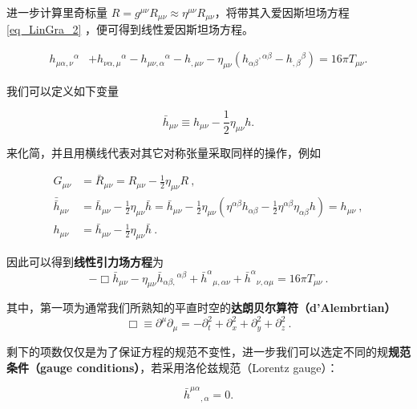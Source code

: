 进一步计算里奇标量 $R = g^{\mu\nu}R_{\mu\nu}\approx \eta^{\mu\nu}R_{\mu\nu}$，将带其入爱因斯坦场方程\autoref{eq_LinGra_2}  ，便可得到线性爱因斯坦场方程。

\begin{equation}
\begin{aligned}
h_{\mu \alpha, \nu}{ }^{\alpha} &+h_{\nu \alpha, \mu}{ }^{\alpha}-h_{\mu \nu, \alpha}{ }^{\alpha}-h_{, \mu \nu} -\eta_{\mu \nu}\left(h_{\alpha \beta}{ }^{, \alpha \beta}-h_{, \beta}{ }^{\beta}\right)= 16 \pi T_{\mu \nu} .
\end{aligned}
\end{equation}

我们可以定义如下变量

\begin{equation}
\bar{h}_{\mu\nu} \equiv h_{\mu\nu} - \frac{1}{2}\eta_{\mu\nu}h.
\end{equation}

来化简，并且用横线代表对其它对称张量采取同样的操作，例如

\begin{align}
G_{\mu\nu} &= \bar{R}_{\mu\nu} = R_{\mu\nu}- \frac{1}{2}\eta_{\mu\nu}R~,\\
\bar{\bar{h}}_{\mu\nu} &= \bar{h}_{\mu\nu} - \frac{1}{2}\eta_{\mu\nu}\bar{h} = \bar{h}_{\mu\nu} - \frac{1}{2}\eta_{\mu\nu} (\eta^{\alpha\beta}h_{\alpha\beta}-\frac{1}{2}\eta^{\alpha\beta}\eta_{\alpha\beta}h)= h_{\mu\nu}~,\\
h_{\mu\nu} &= \bar{h}_{\mu\nu} - \frac{1}{2}\eta_{\mu\nu} \bar{h}~.
\end{align}

因此可以得到\textbf{线性引力场方程}为
\begin{equation}
-\Box{\bar{h}_{\mu \nu}}-\eta_{\mu \nu} \bar{h}_{\alpha \beta,}{ }^{\alpha \beta} + \bar{h}^{\alpha}{ }_{\mu,\alpha\nu} + \bar{h}^{\alpha}{ }_{\nu,\alpha\mu}=16 \pi T_{\mu \nu}~.
\end{equation}

其中，第一项为通常我们所熟知的平直时空的\textbf{达朗贝尔算符（d'Alembrtian）}
$$
\Box \equiv  \partial^\mu\partial_\mu =  - \partial_t^2 + \partial_x^2 +\partial_y^2 + \partial_z^2~.
$$

剩下的项数仅仅是为了保证方程的规范不变性，进一步我们可以选定不同的规\textbf{规范条件（gauge conditions）}，若采用洛伦兹规范（Lorentz gauge）：

\begin{equation}
\bar{h}^{\mu\alpha}{ }_{,\alpha}=0.
\end{equation}

